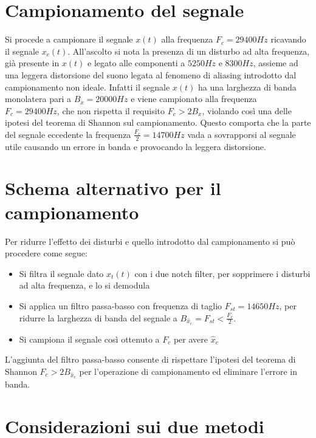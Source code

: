 \documentclass[12pt]{article}
\begin{document}
\section{Campionamento del segnale}

Si procede a campionare il segnale $x(t)$ alla frequenza $F_{c} = 29400Hz$ ricavando il segnale $x_{c}(t)$. All'ascolto si nota la presenza di un disturbo ad alta frequenza, già presente in $x(t)$ e legato alle componenti a $5250Hz$ e $8300Hz$, assieme ad una leggera distorsione del suono legata al fenomeno di aliasing introdotto dal campionamento non ideale. Infatti il segnale $x(t)$ ha una larghezza di banda monolatera pari a $B_{x} = 20000Hz$ e viene campionato alla frequenza $F_{c} = 29400Hz$, che non rispetta il requisito $F_{c} > 2B_{x}$, violando così una delle ipotesi del teorema di Shannon sul campionamento. Questo comporta che la parte del segnale eccedente la frequenza $\frac{F_{c}}{2} = 14700Hz$ vada a sovrapporsi al segnale utile causando un errore in banda e provocando la leggera distorsione.

\section{Schema alternativo per il campionamento}

Per ridurre l'effetto dei disturbi e quello introdotto dal campionamento si può procedere come segue: 
\begin{itemize}
	\item Si filtra il segnale dato $x_{t}(t)$ con i due notch filter, per sopprimere i disturbi ad alta frequenza, e lo si demodula 
	\item Si applica un filtro passa-basso con frequenza di taglio $F_{st} = 14650Hz$, per ridurre la larghezza di banda del segnale a $B_{\hat{x}_{c}} = F_{st} < \frac{F_{c}}{2}$.  
	\item Si campiona il segnale così ottenuto a $F_{c}$ per avere $\hat{x}_{c}$
\end{itemize}

L'aggiunta del filtro passa-basso consente di rispettare l'ipotesi del teorema di Shannon $F_{c} > 2 B_{\hat{x}_{c}}$ per l'operazione di campionamento ed eliminare l'errore in banda.

\section{Considerazioni sui due metodi}
\end{document}
